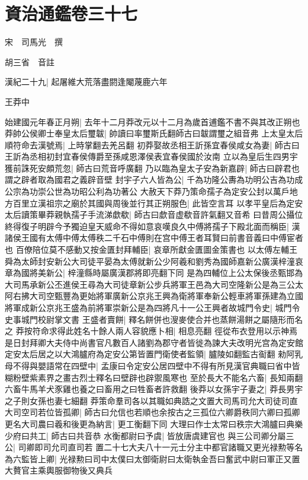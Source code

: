 \section{資治通鑑卷三十七}
宋　司馬光　撰

胡三省　音註

漢紀二十九|{
	起屠維大荒落盡閼逢閹蔑鹿六年}


王莽中

始建國元年春正月朔|{
	去年十二月莽改元以十二月為歲首逋鑑不書不與其改正朔也}
莽帥公侯卿士奉皇太后璽韍|{
	帥讀曰率璽斯氏翻師古曰韍謂璽之組音弗}
上太皇太后順符命去漢號焉|{
	上時掌翻去羌呂翻}
初莽娶故丞相王訢孫宜春侯咸女為妻|{
	師古曰王訢為丞相初封宜春侯傳爵至孫咸恩澤侯表宜春侯國於汝南}
立以為皇后生四男宇獲前誅死安頗荒忽|{
	師古曰荒音呼廣翻}
乃以臨為皇太子安為新嘉辟|{
	師古曰辟君也謂之辟者取為國君之義辟音壁}
封宇子六人皆為公|{
	千為功隆公夀為功明公吉為功成公宗為功崇公世為功昭公利為功著公}
大赦天下莽乃策命孺子為定安公封以萬戶地方百里立漢祖宗之廟於其國與周後並行其正朔服色|{
	此皆空言耳}
以孝平皇后為定安太后讀策畢莽親執孺子手流涕歔欷|{
	師古曰歔音虚欷音許氣翻又音希}
曰昔周公攝位終得復子明辟今予獨迫皇天威命不得如意哀嘆良久中傅將孺子下殿北面而稱臣|{
	漢諸侯王國有太傅中傅太傅秩二千石中傅則在宫中傅王者耳賢曰前書音義曰中傅宦者也}
百僚陪位莫不感動又按金匱封拜輔臣|{
	哀章所獻金匱圖金策書也}
以太傅左輔王舜為太師封安新公大司徒平晏為太傅就新公少阿羲和劉秀為國師嘉新公廣漢梓潼哀章為國將美新公|{
	梓潼縣時屬廣漢郡將即亮翻下同}
是為四輔位上公太保後丞甄邯為大司馬承新公丕進侯王尋為大司徒章新公步兵將軍王邑為大司空隆新公是為三公太阿右拂大司空甄豐為更始將軍廣新公京兆王興為衛將軍奉新公輕車將軍孫建為立國將軍成新公京兆王盛為前將軍崇新公是為四將凡十一公王興者故城門令史|{
	城門令史事城門校尉掌文書}
王盛者賣餅|{
	釋名餅併也溲麥使合并也蒸餅湯餅之屬隨形而名之}
莽按符命求得此姓名十餘人兩人容貌應卜相|{
	相息亮翻}
徑從布衣登用以示神焉是日封拜卿大夫侍中尚書官凡數百人諸劉為郡守者皆徙為諫大夫改明光宫為定安館定安太后居之以大鴻臚府為定安公第皆置門衛使者監領|{
	臚陵如翻監古䘖翻}
勑阿乳母不得與嬰語常在四壁中|{
	孟康曰令定安公居四壁中不得有所見漢官典職曰省中皆糊粉壁紫素界之畫古烈士釋名曰壁辟也辟禦風寒也}
至於長大不能名六畜|{
	長知兩翻六畜牛馬羊犬豕雞也養之曰畜用之曰牲畜者許救翻}
後莽以女孫宇子妻之|{
	莽長男宇之子則女孫也妻七細翻}
莽策命羣司各以其職如典誥之文置大司馬司允大司徒司直大司空司若位皆孤卿|{
	師古曰允信也若順也余按古之三孤位六卿爵秩同六卿曰孤卿}
更名大司農曰羲和後更為納言|{
	更工衡翻下同}
大理曰作士太常曰秩宗大鴻臚曰典樂少府曰共工|{
	師古曰共音恭}
水衡都尉曰予虞|{
	皆放唐虞建官也}
與三公司卿分屬三公|{
	司卿即司允司直司若}
置二十七大夫八十一元士分主中都官諸職又更光禄勲等名為六監皆上卿|{
	光禄勲曰司中太僕曰太御衛尉曰太衛執金吾曰奮武中尉曰軍正又置大贅官主乘輿服御物後又典兵}
